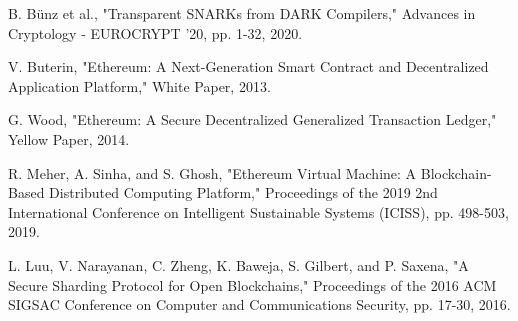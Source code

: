 \documentclass[11pt]{article}
\begin{document}
B. Bünz et al., "Transparent SNARKs from DARK Compilers," Advances in Cryptology - EUROCRYPT '20, pp. 1-32, 2020.


V. Buterin, "Ethereum: A Next-Generation Smart Contract and Decentralized Application Platform," White Paper, 2013.


G. Wood, "Ethereum: A Secure Decentralized Generalized Transaction Ledger," Yellow Paper, 2014.


R. Meher, A. Sinha, and S. Ghosh, "Ethereum Virtual Machine: A Blockchain-Based Distributed Computing Platform," Proceedings of the 2019 2nd International Conference on Intelligent Sustainable Systems (ICISS), pp. 498-503, 2019.


L. Luu, V. Narayanan, C. Zheng, K. Baweja, S. Gilbert, and P. Saxena, "A Secure Sharding Protocol for Open Blockchains," Proceedings of the 2016 ACM SIGSAC Conference on Computer and Communications Security, pp. 17-30, 2016.
\end{document}
